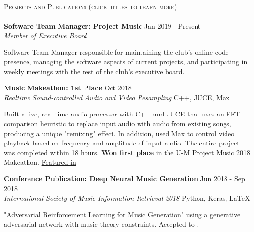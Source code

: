 \documentclass[11pt]{extarticle}
\newcommand{\lineunder} {
	\vspace*{-8pt} \\
	\hspace*{-18pt} \hrulefill \\
}
\newcommand{\header} [1] {
	{\hspace*{-18pt}\vspace*{6pt} \textsc{#1}}
	\vspace*{-6pt} \lineunder
}
\begin{document}
\newpage
\noindent
\header{Projects and Publications (click titles to learn more)}
\noindent
\href{https://maizepages.umich.edu/organization/expermentalmusicalinstruments}{\textbf{Software Team Manager: Project Music}} \hfill Jan 2019 - Present\\
\textit{Member of Executive Board} \\
\vspace{-25pt}
\begin{paragraph}{}
	 Software Team Manager responsible for maintaining the club's online code presence, managing the software aspects of current projects, and participating in weekly meetings with the rest of the club's executive board.  \\
\end{paragraph}

\noindent
\href{https://github.com/nacgarg/music-makeathon}{\textbf{Music Makeathon: 1st Place}} \hfill Oct 2018\\
\textit{Realtime Sound-controlled Audio and Video Resampling} \hfill C++, JUCE, Max \\
\vspace{-25pt}
\begin{paragraph}{}
	 Built a live, real-time audio processor with C++ and JUCE that uses an FFT comparison heuristic to replace input audio with audio from existing songs, producing a unique "remixing" effect. In addition, used Max to control video playback based on frequency and amplitude of input audio. The entire project was completed within 18 hours. \textbf{Won first place} in the U-M Project Music 2018 Makeathon.
	 \href{https://news.engin.umich.edu/2018/12/hacking-the-perfect-melody/}{Featured in \color{blue}{U-M Engineering Newsletter.}} \\
\end{paragraph}


\noindent
\href{http://ismir2018.ircam.fr/pages/events-lbd.html}{\textbf{Conference Publication: Deep Neural Music Generation}} \hfill Jun 2018 - Sep 2018\\
\textit{International Society of Music Information Retrieval 2018} \hfill Python, Keras, \LaTeX\\
\vspace{-25pt}
\begin{paragraph}{}
\begin{sloppypar}
"Adversarial Reinforcement Learning for Music Generation" using a generative adversarial network with music theory constraints. Accepted to \href{http://ismir2018.ircam.fr/pages/events-lbd.html}{\color{blue}{ISMIR 2018, Late Breaking Session}}.\\
\end{sloppypar}
\end{paragraph}
\end{document}

